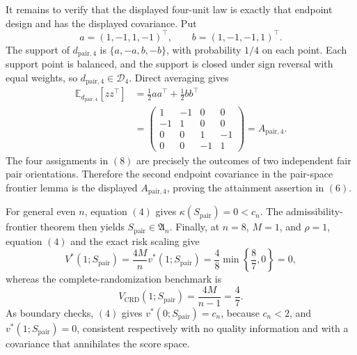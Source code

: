 It remains to verify that the displayed four-unit law is exactly that endpoint design and has the displayed covariance.  Put
\[
a=(1,-1,1,-1)^\top,
\qquad
b=(1,-1,-1,1)^\top.
\]
The support of \(d_{\mathrm{pair},4}\) is \(\{a,-a,b,-b\}\), with probability \(1/4\) on each point.  Each support point is balanced, and the support is closed under sign reversal with equal weights, so \(d_{\mathrm{pair},4}\in\mathcal D_4\).  Direct averaging gives
\[
\begin{aligned}
\mathbb E_{d_{\mathrm{pair},4}}[zz^\top]
&=\frac12aa^\top+\frac12bb^\top\\
&=
\begin{pmatrix}
1&-1&0&0\\
-1&1&0&0\\
0&0&1&-1\\
0&0&-1&1
\end{pmatrix}
=A_{\mathrm{pair},4}.
\end{aligned}
\tag{8}
\]
The four assignments in \((8)\) are precisely the outcomes of two independent fair pair orientations.  Therefore the second endpoint covariance in the pair-space frontier lemma is the displayed \(A_{\mathrm{pair},4}\), proving the attainment assertion in \((6)\).

For general even \(n\), equation \((4)\) gives \(\kappa(S_{\mathrm{pair}})=0<c_n\).  The admissibility-frontier theorem then yields \(S_{\mathrm{pair}}\in\mathfrak A_n\).  Finally, at \(n=8\), \(M=1\), and \(\rho=1\), equation \((4)\) and the exact risk scaling give
\[
V^*(1;S_{\mathrm{pair}})
=\frac{4M}{n}v^*(1;S_{\mathrm{pair}})
=\frac48\min\left\{\frac87,0\right\}=0,
\tag{9}
\]
whereas the complete-randomization benchmark is
\[
V_{\mathrm{CRD}}(1;S_{\mathrm{pair}})
=\frac{4M}{n-1}=\frac47.
\tag{10}
\]
As boundary checks, \((4)\) gives \(v^*(0;S_{\mathrm{pair}})=c_n\), because \(c_n<2\), and \(v^*(1;S_{\mathrm{pair}})=0\), consistent respectively with no quality information and with a covariance that annihilates the score space.